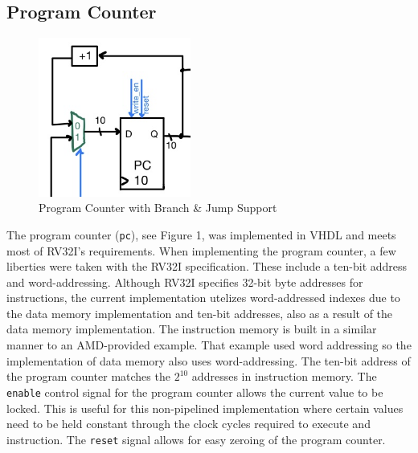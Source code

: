 \documentclass[lettersize,journal]{IEEEtran}
\begin{document}
\subsection{Program Counter}
\begin{figure}[!h]
  \label{fig:pc}
  \centering
  \includegraphics[width=5cm]{PC.jpg}
  \caption{Program Counter with Branch \& Jump Support}
\end{figure}
The program counter (\verb|pc|), see Figure 1, was implemented in VHDL and meets most of RV32I's requirements.
When implementing the program counter, a few liberties were taken with the RV32I specification.
These include a ten-bit address and word-addressing.
Although RV32I specifies 32-bit byte addresses for instructions, the current implementation utelizes word-addressed indexes 
due to the data memory implementation and ten-bit addresses, also as a result of the data memory implementation.
The instruction memory is built in a similar manner to an AMD-provided example.
That example used word addressing so the implementation of data memory also uses word-addressing.
The ten-bit address of the program counter matches the $2^{10}$ addresses in instruction memory.
The \verb|enable| control signal for the program counter allows the current value to be locked.
This is useful for this non-pipelined implementation where certain values need to be held constant through the clock cycles required to execute and instruction.
The \verb|reset| signal allows for easy zeroing of the program counter. 
\end{document}
